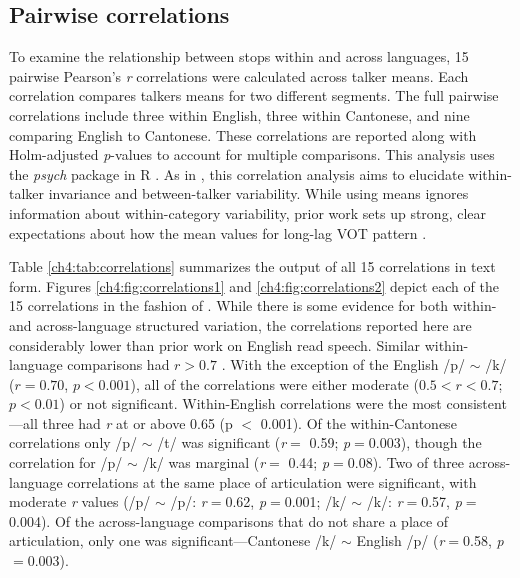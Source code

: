 \subsection{Pairwise correlations}\label{ch4:sec:correlations}
To examine the relationship between stops within and across languages, 15 pairwise Pearson's \textit{r} correlations were calculated across talker means. Each correlation compares talkers means for two different segments. The full pairwise correlations include three within English, three within Cantonese, and nine comparing English to Cantonese. These correlations are reported along with Holm-adjusted \textit{p}-values to account for multiple comparisons. This analysis uses the \textit{psych} \citep{revelle_2021_psych} package in R \citep{r_2021}. As in \citet{chodroff_2017_structure}, this correlation analysis aims to elucidate within-talker invariance and between-talker variability. While using means ignores information about within-category variability, prior work sets up strong, clear expectations about how the mean values for long-lag VOT pattern \citep{chodroff_2017_structure, cho_1999_vot}. 

Table \ref{ch4:tab:correlations} summarizes the output of all 15 correlations in text form. Figures \ref{ch4:fig:correlations1} and \ref{ch4:fig:correlations2} depict each of the 15 correlations in the fashion of \cite{chodroff_2017_structure}. While there is some evidence for both within- and across-language structured variation, the correlations reported here are considerably lower than prior work on English read speech. Similar within-language comparisons had $r>0.7$ \citep{chodroff_2017_structure, chodroff_2019_l2}. With the exception of the English /p/ $\sim$ /k/ ($r=0.70$, $p<0.001$), all of the correlations were either moderate ($0.5<r<0.7$; $p<0.01$) or not significant. Within-English correlations were the most consistent---all three had \textit{r} at or above 0.65 (p $<$ 0.001). Of the within-Cantonese correlations only /p/ $\sim$ /t/ was significant (\textit{r}$=$ 0.59; \textit{p}$=$0.003), though the correlation for /p/ $\sim$ /k/ was marginal (\textit{r}$=$ 0.44; \textit{p}$=$0.08). Two of three across-language correlations at the same place of articulation were significant, with moderate \textit{r} values (/p/ $\sim$ /p/: \textit{r}$=$0.62, \textit{p}$=$0.001; /k/ $\sim$ /k/: \textit{r}$=$0.57, \textit{p}$=$0.004). Of the across-language comparisons that do not share a place of articulation, only one was significant---Cantonese /k/ $\sim$ English /p/ (\textit{r}$=$0.58, \textit{p}$=$0.003).

